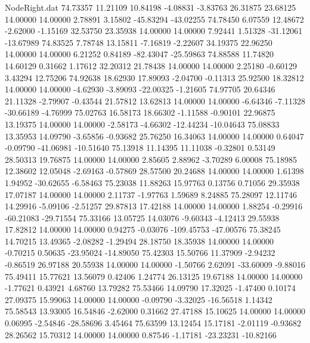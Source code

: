\begin{filecontents}{NodeRight.dat}
  74.73357   11.21109   10.84198    -4.08831   -3.83763   26.31875   23.68125   14.00000   14.00000    2.78891    3.15802  -45.83294  -43.02255
  74.78450    6.07559   12.48672    -2.62000   -1.15169   32.53750   23.35938   14.00000   14.00000    7.92441    1.51328  -31.12061  -13.67989
  74.83525    7.78748   13.15811    -7.16819   -2.22607   34.19375   22.96250   14.00000   14.00000    6.21252    0.84189  -82.43047  -25.59863
  74.88588   11.74820   14.60129     0.31662    1.17612   32.20312   21.78438   14.00000   14.00000    2.25180   -0.60129    3.43294   12.75206
  74.92638   18.62930   17.89093    -2.04700   -0.11313   25.92500   18.32812   14.00000   14.00000   -4.62930   -3.89093  -22.00325   -1.21605
  74.97705   20.64346   21.11328    -2.79907   -0.43544   21.57812   13.62813   14.00000   14.00000   -6.64346   -7.11328  -30.66189   -4.76999
  75.02763   16.58173   18.66302    -1.11588   -0.90101   22.96875   13.19375   14.00000   14.00000   -2.58173   -4.66302  -12.44234  -10.04643
  75.08833   13.35953   14.09790    -3.65856   -0.93682   25.76250   16.34063   14.00000   14.00000    0.64047   -0.09790  -41.06981  -10.51640
  75.13918   11.14395   11.11038    -0.32801    0.53149   28.50313   19.76875   14.00000   14.00000    2.85605    2.88962   -3.70289    6.00008
  75.18985   12.38602   12.05048    -2.69163   -0.57869   28.57500   20.24688   14.00000   14.00000    1.61398    1.94952  -30.62655   -6.58463
  75.23038   11.88263   15.97763     0.13756    0.71056   29.35938   17.07187   14.00000   14.00000    2.11737   -1.97763    1.59689    8.24885
  75.28097   12.11746   14.29916    -5.09106   -2.51257   29.87813   17.42188   14.00000   14.00000    1.88254   -0.29916  -60.21083  -29.71554
  75.33166   13.05725   14.03076    -9.60343   -4.12413   29.55938   17.82812   14.00000   14.00000    0.94275   -0.03076 -109.45753  -47.00576
  75.38245   14.70215   13.49365    -2.08282   -1.29494   28.18750   18.35938   14.00000   14.00000   -0.70215    0.50635  -23.95024  -14.89050
  75.42303   15.50766   11.37909    -2.94232   -0.86519   26.97188   20.55938   14.00000   14.00000   -1.50766    2.62091  -33.60009   -9.88016
  75.49411   15.77621   13.56079     0.42406    1.24774   26.13125   19.67188   14.00000   14.00000   -1.77621    0.43921    4.68760   13.79282
  75.53466   14.09790   17.32025    -1.47400    0.10174   27.09375   15.99063   14.00000   14.00000   -0.09790   -3.32025  -16.56518    1.14342
  75.58543   13.93005   16.54846    -2.62000    0.31662   27.47188   15.10625   14.00000   14.00000    0.06995   -2.54846  -28.58696    3.45464
  75.63599   13.12454   15.17181    -2.01119   -0.93682   28.26562   15.70312   14.00000   14.00000    0.87546   -1.17181  -23.23231  -10.82166

\end{filecontents}

